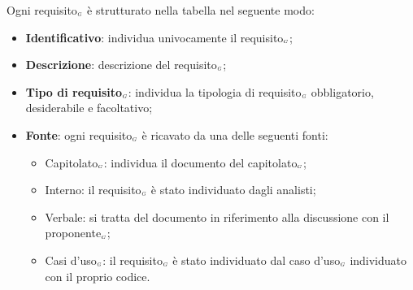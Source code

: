 Ogni requisito$_{\scaleto{G}{3pt}}$ è strutturato nella tabella nel seguente modo:
\begin{itemize}
	\item \textbf{Identificativo}: individua univocamente il requisito$_{\scaleto{G}{3pt}}$;
	\item \textbf{Descrizione}: descrizione del requisito$_{\scaleto{G}{3pt}}$; %
	\item \textbf{Tipo di requisito$_{\scaleto{G}{3pt}}$}: individua la tipologia di requisito$_{\scaleto{G}{3pt}}$ obbligatorio, desiderabile e facoltativo;
	\item \textbf{Fonte}: ogni requisito$_{\scaleto{G}{3pt}}$ è ricavato da una delle seguenti fonti:
	\begin{itemize}
		\item Capitolato$_{\scaleto{G}{3pt}}$: individua il documento del capitolato$_{\scaleto{G}{3pt}}$;
		\item Interno: il requisito$_{\scaleto{G}{3pt}}$ è stato individuato dagli analisti;
		\item Verbale: si tratta del documento in riferimento alla discussione con il proponente$_{\scaleto{G}{3pt}}$;
		\item Casi d'uso$_{\scaleto{G}{3pt}}$: il requisito$_{\scaleto{G}{3pt}}$ è stato individuato dal caso d'uso$_{\scaleto{G}{3pt}}$ individuato con il proprio codice.
	\end{itemize}
\end{itemize}
